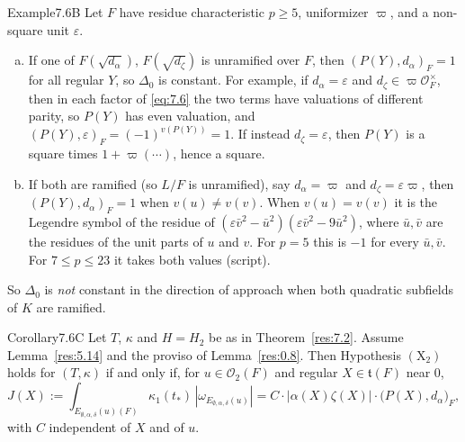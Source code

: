 \documentclass[12pt,letterpaper]{amsart}
\theoremstyle{plain}
\theoremstyle{definition}
\theoremstyle{remark}
\theoremstyle{definition}
\begin{document}
\begin{resdef}{Example}{7.6B}\label{res:7.6B}
Let $F$ have residue characteristic $p\geq5$, uniformizer $\varpi$, and a
non-square unit $\varepsilon$.
\begin{enumerate}[(a)]
\item If one of $F(\sqrt{d_\alpha})$, $F(\sqrt{d_\zeta})$ is unramified over
$F$, then $(P(Y),d_\alpha)_F=1$ for all regular $Y$, so $\Delta_0$ is
constant. For example, if $d_\alpha=\varepsilon$ and $d_\zeta\in\varpi\mathcal
O_F^\times$, then in each factor of \eqref{eq:7.6} the two terms have
valuations of different parity, so $P(Y)$ has even valuation, and
$(P(Y),\varepsilon)_F=(-1)^{v(P(Y))}=1$. If instead $d_\zeta=\varepsilon$, then
$P(Y)$ is a square times $1+\varpi(\cdots)$, hence a square.
\item If both are ramified (so $L/F$ is unramified), say $d_\alpha=\varpi$ and
$d_\zeta=\varepsilon\varpi$, then $(P(Y),d_\alpha)_F=1$ when $v(u)\neq v(v)$.
When $v(u)=v(v)$ it is the Legendre symbol of the residue of
$(\varepsilon\bar v^2-\bar u^2)(\varepsilon\bar v^2-9\bar u^2)$, where
$\bar u,\bar v$ are the residues of the unit parts of $u$ and $v$. For $p=5$
this is $-1$ for every $\bar u,\bar v$. For $7\le p\le23$ it takes both values
(script).
\end{enumerate}
So $\Delta_0$ is \emph{not} constant in the direction of approach when both
quadratic subfields of $K$ are ramified.
\end{resdef}

\begin{res}{Corollary}{7.6C}\label{res:7.6C}
Let $T$, $\kappa$ and $H=H_2$ be as in Theorem~\ref{res:7.2}. Assume
Lemma~\ref{res:5.14} and the proviso of Lemma~\ref{res:0.8}. Then Hypothesis
$(\mathrm X_2)$ holds for $(T,\kappa)$ if and only if, for $u\in\mathcal O_2(F)$
and regular $X\in\mathfrak t(F)$ near $0$,
\begin{equation}\tag{7.7}\label{eq:7.7}
J(X):=\int_{E_{\emptyset,\alpha,\delta}(u)(F)}\kappa_1(t_*)
\,|\omega_{E_{\emptyset,\alpha,\delta}(u)}|
=C\cdot|\alpha(X)\zeta(X)|\cdot\bigl(P(X),d_\alpha\bigr)_F,
\end{equation}
with $C$ independent of $X$ and of $u$.
\end{res}
\end{document}
